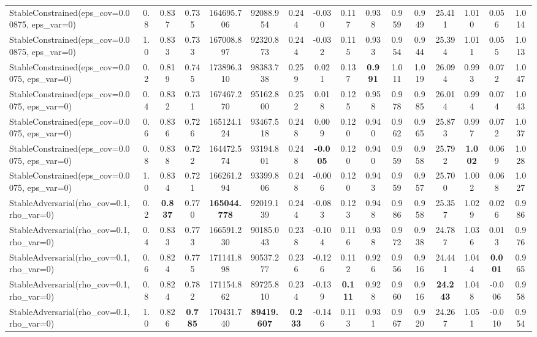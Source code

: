 \documentclass[11pt]{article}
\theoremstyle{plain}
\theoremstyle{definition}
\newcommand{\1}{\mathbf{1}}
\begin{document}
\begin{table}[h]
{\begin{tabular}{lccccccccccccccc}
StableConstrained(eps\_cov=0.00875, eps\_var=0) & 0.8 & 0.837 & 0.735 & 164695.706 & 92088.954 & 0.244 & -0.030 & 0.117 & 0.938 & 0.959 & 0.949 & 25.411 & 1.010 & 0.056 & 1.014 \\
StableConstrained(eps\_cov=0.00875, eps\_var=0) & 1.0 & 0.833 & 0.733 & 167008.897 & 92320.873 & 0.244 & -0.032 & 0.115 & 0.933 & 0.954 & 0.944 & 25.394 & 1.011 & 0.055 & 1.013 \\
StableConstrained(eps\_cov=0.0075, eps\_var=0) & 0.2 & 0.819 & 0.745 & 173896.310 & 98383.738 & 0.259 & 0.021 & 0.137 & \textbf{0.991} & 1.011 & 1.019 & 26.094 & 0.993 & 0.072 & 1.047 \\
StableConstrained(eps\_cov=0.0075, eps\_var=0) & 0.4 & 0.832 & 0.731 & 167467.270 & 95162.800 & 0.252 & 0.018 & 0.125 & 0.958 & 0.978 & 0.985 & 26.014 & 0.994 & 0.074 & 1.043 \\
StableConstrained(eps\_cov=0.0075, eps\_var=0) & 0.6 & 0.836 & 0.726 & 165124.124 & 93467.518 & 0.248 & 0.009 & 0.120 & 0.940 & 0.962 & 0.965 & 25.873 & 0.997 & 0.072 & 1.037 \\
StableConstrained(eps\_cov=0.0075, eps\_var=0) & 0.8 & 0.838 & 0.722 & 164472.574 & 93194.801 & 0.248 & \textbf{-0.005} & 0.120 & 0.940 & 0.959 & 0.958 & 25.792 & \textbf{1.002} & 0.069 & 1.028 \\
StableConstrained(eps\_cov=0.0075, eps\_var=0) & 1.0 & 0.834 & 0.721 & 166261.294 & 93399.806 & 0.248 & -0.006 & 0.120 & 0.943 & 0.959 & 0.957 & 25.700 & 1.002 & 0.068 & 1.027 \\
StableAdversarial(rho\_cov=0.1, rho\_var=0) & 0.2 & \textbf{0.837} & 0.770 & \textbf{165044.778} & 92019.139 & 0.244 & -0.083 & 0.123 & 0.948 & 0.986 & 0.958 & 25.357 & 1.029 & 0.026 & 0.986 \\
StableAdversarial(rho\_cov=0.1, rho\_var=0) & 0.4 & 0.833 & 0.773 & 166591.230 & 90185.043 & 0.238 & -0.104 & 0.116 & 0.938 & 0.972 & 0.938 & 24.787 & 1.036 & 0.013 & 0.976 \\
StableAdversarial(rho\_cov=0.1, rho\_var=0) & 0.6 & 0.824 & 0.775 & 171141.898 & 90537.277 & 0.236 & -0.126 & 0.112 & 0.926 & 0.956 & 0.916 & 24.441 & 1.044 & \textbf{0.001} & 0.965 \\
StableAdversarial(rho\_cov=0.1, rho\_var=0) & 0.8 & 0.824 & 0.782 & 171154.862 & 89725.810 & 0.234 & -0.139 & \textbf{0.111} & 0.928 & 0.960 & 0.916 & \textbf{24.243} & 1.048 & -0.006 & 0.958 \\
StableAdversarial(rho\_cov=0.1, rho\_var=0) & 1.0 & 0.826 & \textbf{0.785} & 170431.740 & \textbf{89419.607} & \textbf{0.233} & -0.146 & 0.113 & 0.931 & 0.967 & 0.920 & 24.267 & 1.051 & -0.010 & 0.954 \\

\end{tabular}}
\end{table}
\end{document}

